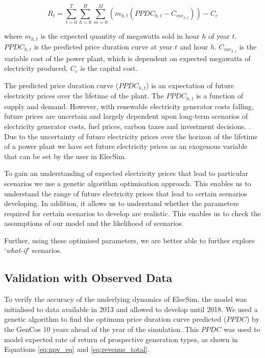 \begin{equation}
\label{eq:revenue_total}
R_t = 
\sum\limits_{t=0}^T 
\sum\limits_{h=0}^H
\sum\limits_{m=0}^M \left(
m_{h,t}(PPDC_{h,t}
-
C_{var_{h,t}})\right)
- C_c
\end{equation}

\noindent where $m_{h,t}$ is the expected quantity of megawatts sold in hour $h$ of year $t$. $PPDC_{h,t}$ is the predicted price duration curve at year $t$ and hour $h$. $C_{var_{h,t}}$ is the variable cost of the power plant, which is dependent on expected megawatts of electricity produced, $C_c$ is the capital cost.

The predicted price duration curve ($PPDC_{h,t}$) is an expectation of future electricity prices over the lifetime of the plant. The $PPDC_{h,t}$ is a function of supply and demand. However, with renewable electricity generator costs falling, future prices are uncertain and largely dependent upon long-term scenarios of electricity generator costs, fuel prices, carbon taxes and investment decisions. \cite{IRENA2014}. Due to the uncertainty of future electricity prices over the horizon of the lifetime of a power plant we have set future electricity prices as an exogenous variable that can be set by the user in ElecSim. 


To gain an understanding of expected electricity prices that lead to particular scenarios we use a genetic algorithm optimisation approach. This enables us to understand the range of future electricity prices that lead to certain scenarios developing. In addition, it allows us to understand whether the parameters required for certain scenarios to develop are realistic. This enables us to check the assumptions of our model and the likelihood of scenarios.

Further, using these optimised parameters, we are better able to further explore `\textit{what-if}' scenarios.




\subsection{Validation with Observed Data}
\label{sssec:validation}

To verify the accuracy of the underlying dynamics of ElecSim, the model was initialised to data available in 2013 and allowed to develop until 2018. We used a genetic algorithm to find the optimum price duration curve predicted ($PPDC$) by the GenCos 10 years ahead of the year of the simulation. This $PPDC$ was used to model expected rate of return of prospective generation types, as shown in Equations \ref{eq:npv_eq} and \ref{eq:revenue_total}. 

